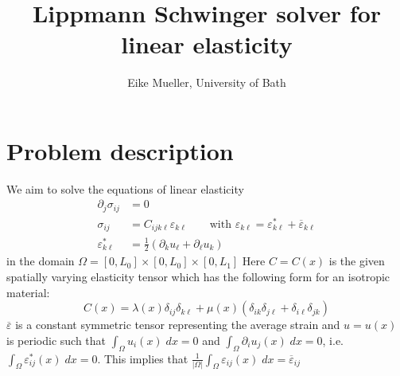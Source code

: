 \documentclass[11pt]{article}
\title{Lippmann Schwinger solver for linear elasticity}
\author{Eike Mueller, University of Bath}
\begin{document}
\maketitle
\section{Problem description}
We aim to solve the equations of linear elasticity
\begin{equation}
    \begin{aligned}
        \partial_j \sigma_{ij} &= 0 \\
        \sigma_{ij} &= C_{ijk\ell} \varepsilon_{k\ell}\qquad\text{with $\varepsilon_{k\ell} = \varepsilon^*_{k\ell} + \overline{\varepsilon}_{k\ell}$}\\
        \varepsilon^*_{k\ell} &= \frac{1}{2}\left(\partial_k u_\ell + \partial_\ell u_k\right)
    \end{aligned}\label{eqn:continuum_equations}
\end{equation}
in the domain $\Omega=[0,L_0]\times[0,L_0]\times[0,L_1]$
Here $C=C(x)$ is the given spatially varying elasticity tensor which has the following form for an isotropic material:
\begin{equation}
    C(x) = \lambda(x) \delta_{ij}\delta_{k\ell} + \mu(x) (\delta_{ik}\delta_{j\ell} + \delta_{i\ell}\delta_{jk})
\end{equation}
$\overline{\varepsilon}$ is a constant symmetric tensor representing the average strain and $u=u(x)$ is periodic such that $\int_\Omega u_i(x)\;dx = 0$ and $\int_\Omega \partial_i u_j(x)\;dx = 0$, i.e. $\int_\Omega \varepsilon^*_{ij}(x)\;dx=0$. This implies that $\frac{1}{|\Omega|}\int_\Omega \varepsilon_{ij}(x)\;dx=\overline{\varepsilon}_{ij}$
\end{document}
